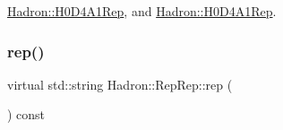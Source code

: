 \mbox{\hyperlink{structHadron_1_1H0D4A1Rep_afbedc9857e7215106a2225ff351ada68}{Hadron\+::\+H0\+D4\+A1\+Rep}}, and \mbox{\hyperlink{structHadron_1_1H0D4A1Rep_afbedc9857e7215106a2225ff351ada68}{Hadron\+::\+H0\+D4\+A1\+Rep}}.

\mbox{\label{structHadron_1_1RepRep_ab3213025f6de249f7095892109575fde}} 
\subsubsection{\texorpdfstring{rep()}{rep()}\hspace{0.1cm}{\footnotesize\ttfamily [2/2]}}
{\footnotesize\ttfamily virtual std\+::string Hadron\+::\+Rep\+Rep\+::rep (\begin{DoxyParamCaption}{ }\end{DoxyParamCaption}) const\hspace{0.3cm}{\ttfamily [pure virtual]}}



